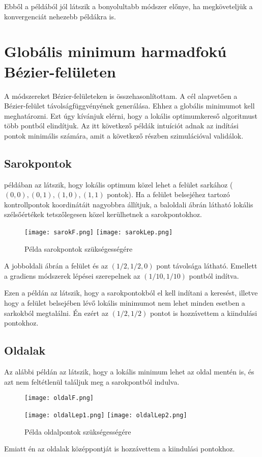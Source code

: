 Ebből a példából jól látszik a bonyolultabb módszer előnye, ha megköveteljük a konvergenciát nehezebb példákra is.



\section{Globális minimum harmadfokú Bézier-felületen}

A módszereket Bézier-felületeken is összehasonlítottam. A cél alapvetően a Bézier-felület távolságfüggvényének generálása. Ehhez a globális minimumot kell meghatározni. Ezt úgy kívánjuk elérni, hogy a lokális optimumkereső algoritmust több pontból elindítjuk. Az itt következő példák intuíciót adnak az indítási pontok minimális számára, amit a következő részben szimulációval validálok.

\subsection{Sarokpontok}
 példában az látszik, hogy lokális optimum közel lehet a felület sarkához ($(0,0),(0,1),(1,0),(1,1)$ pontok). Ha a felület belsejéhez tartozó kontrollpontok koordinátáit nagyobbra állítjuk, a baloldali ábrán látható lokális szélsőértékek tetszőlegesen közel kerülhetnek a sarokpontokhoz. 
\begin{figure}[H]
	\centering
	\texttt{[image: sarokF.png]}
	\hspace{5pt}
	\texttt{[image: sarokLep.png]}
	\caption{Példa sarokpontok szükségességére}
	\label{fig:corners}
\end{figure}
A jobboldali ábrán a felület és az $(1/2,1/2,0)$ pont távolsága látható. Emellett a gradiens módszerek lépései szerepelnek az $(1/10,1/10)$ pontból indítva.

Ezen a példán az látszik, hogy a sarokpontokból el kell indítani a keresést, illetve hogy a felület belsejében lévő lokális minimumot nem lehet minden esetben a sarkokból megtalálni. Én ezért az $(1/2,1/2)$ pontot is hozzávettem a kiindulási pontokhoz.

\subsection{Oldalak}
Az alábbi példán az látszik, hogy a lokális minimum lehet az oldal mentén is, és azt nem feltétlenül találjuk meg a sarokpontból indulva.
\begin{figure}[H]
	\centering
	\texttt{[image: oldalF.png]}
\end{figure}
\begin{figure}[H]
	\centering
	\texttt{[image: oldalLep1.png]}
	\hspace{5pt}
	\texttt{[image: oldalLep2.png]}
	\caption{Példa oldalpontok szükségességére}
\end{figure}
Emiatt én az oldalak középpontját is hozzávettem a kiindulási pontokhoz.

